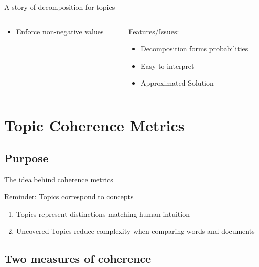 \documentclass[compress]{beamer}
\begin{document}
\begin{frame}{A story of decomposition for topics}
\begin{overlayarea}{\textwidth}{4cm}
{\begin{columns}
\begin{column}[1]{5.5cm}
\begin{itemize}
$ || A - W H' ||^2 $
\item Enforce non-negative values
\end{itemize}
\end{column}
\begin{column}[2]{5cm}
Features/Issues:
\begin{itemize}
\item Decomposition forms probabilities
\item Easy to interpret
\item Approximated Solution
\end{itemize}
\end{column}
\end{columns}
}
\end{overlayarea}
\end{frame}

\section{Topic Coherence Metrics}

\subsection{Purpose}

\begin{frame}{The idea behind coherence metrics}
\begin{block}{Reminder: Topics correspond to concepts}
\begin{enumerate}
\item Topics represent distinctions matching human intuition
\item Uncovered Topics reduce complexity when comparing words and documents
\end{enumerate}
\end{block}
\begin{overlayarea}{\textwidth}{4cm}
\end{overlayarea}
\end{frame}

\subsection{Two measures of coherence}
\end{document}
